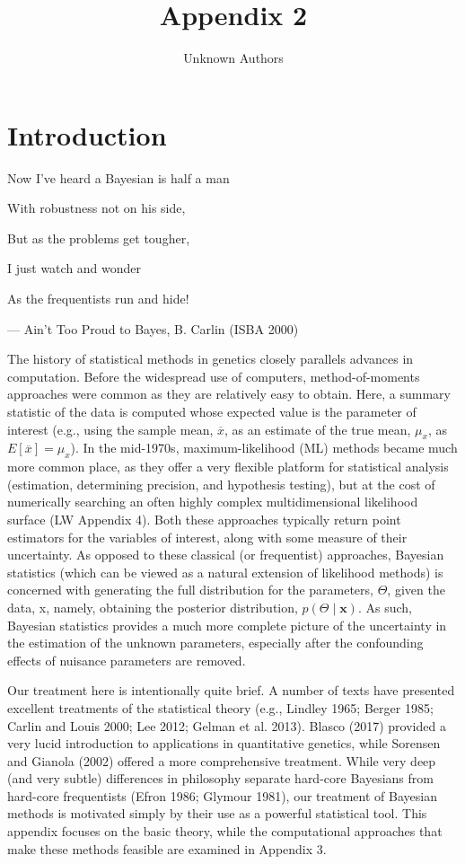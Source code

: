 \documentclass{article}
\title{Appendix 2}
\author{Unknown Authors}
\date{}
\begin{document}
\maketitle

\begin{abstract}

\end{abstract}

\section{Introduction}
Now I've heard a Bayesian is half a man

With robustness not on his side,

But as the problems get tougher,

I just watch and wonder

As the frequentists run and hide!

— Ain’t Too Proud to Bayes, B. Carlin (ISBA 2000)

The history of statistical methods in genetics closely parallels advances in computation. Before the widespread use of computers, method-of-moments approaches were common as they are relatively easy to obtain. Here, a summary statistic of the data is computed whose expected value is the parameter of interest (e.g., using the sample mean,  $ \overline{x} $, as an estimate of the true mean,  $ \mu_x $, as  $ E[\overline{x}] = \mu_x $). In the mid-1970s, maximum-likelihood (ML) methods became much more common place, as they offer a very flexible platform for statistical analysis (estimation, determining precision, and hypothesis testing), but at the cost of numerically searching an often highly complex multidimensional likelihood surface (LW Appendix 4). Both these approaches typically return point estimators for the variables of interest, along with some measure of their uncertainty. As opposed to these classical (or frequentist) approaches, Bayesian statistics (which can be viewed as a natural extension of likelihood methods) is concerned with generating the full distribution for the parameters,  $ \Theta $, given the data, x, namely, obtaining the posterior distribution,  $ p(\Theta \mid \mathbf{x}) $. As such, Bayesian statistics provides a much more complete picture of the uncertainty in the estimation of the unknown parameters, especially after the confounding effects of nuisance parameters are removed.

Our treatment here is intentionally quite brief. A number of texts have presented excellent treatments of the statistical theory (e.g., Lindley 1965; Berger 1985; Carlin and Louis 2000; Lee 2012; Gelman et al. 2013). Blasco (2017) provided a very lucid introduction to applications in quantitative genetics, while Sorensen and Gianola (2002) offered a more comprehensive treatment. While very deep (and very subtle) differences in philosophy separate hard-core Bayesians from hard-core frequentists (Efron 1986; Glymour 1981), our treatment of Bayesian methods is motivated simply by their use as a powerful statistical tool. This appendix focuses on the basic theory, while the computational approaches that make these methods feasible are examined in Appendix 3.
\end{document}
